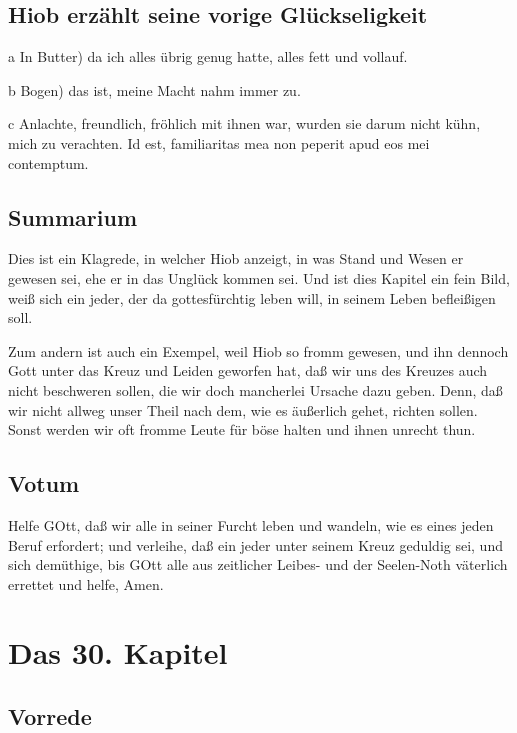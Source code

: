 \section{Hiob erzählt seine vorige Glückseligkeit}

a In Butter) da ich alles übrig genug hatte, alles fett und vollauf.

b Bogen) das ist, meine Macht nahm immer zu.

c Anlachte, freundlich, fröhlich mit ihnen war, wurden sie darum nicht kühn, mich zu verachten. Id est, familiaritas mea non peperit apud eos mei contemptum.

\section{Summarium}

Dies ist ein Klagrede, in welcher Hiob anzeigt, in was Stand und Wesen er gewesen sei, ehe er in das Unglück kommen sei. Und ist dies Kapitel ein fein Bild, weiß sich ein jeder, der da gottesfürchtig leben will, in seinem Leben befleißigen soll.

Zum andern ist auch ein Exempel, weil Hiob so fromm gewesen, und ihn dennoch Gott unter das Kreuz und Leiden geworfen hat, daß wir uns des Kreuzes auch nicht beschweren sollen, die wir doch mancherlei Ursache dazu geben. Denn, daß wir nicht allweg unser Theil nach dem, wie es äußerlich gehet, richten sollen. Sonst werden wir oft fromme Leute für böse halten und ihnen unrecht thun.

\section{Votum}

Helfe GOtt, daß wir alle in seiner Furcht leben und wandeln, wie es eines jeden Beruf erfordert; und verleihe, daß ein jeder unter seinem Kreuz geduldig sei, und sich demüthige, bis GOtt alle aus zeitlicher Leibes- und der Seelen-Noth väterlich errettet und helfe, Amen.

\chapter{Das 30. Kapitel}

\section{Vorrede}

